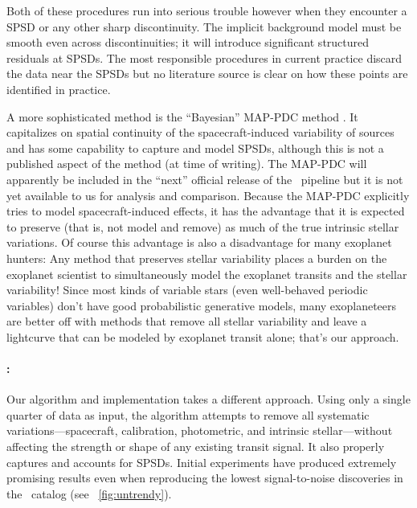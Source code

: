 \documentclass[letterpaper,12pt,preprint]{hack_aastex}
\newcommand{\Untrendy}{\package{Untrendy}}
\begin{document}
Both of these procedures run into serious trouble however when they encounter a SPSD
or any other sharp discontinuity.
The implicit background model must be smooth even across discontinuities; it
will introduce significant structured residuals at SPSDs.
The most responsible procedures in current practice discard the data
near the SPSDs but no literature source is clear on how these points are
identified in practice.

A more sophisticated method is the ``Bayesian'' MAP-PDC method
\citep{map-pdc1,map-pdc2}.
It capitalizes on spatial
continuity of the spacecraft-induced variability of sources and
has some capability to capture and model SPSDs, although this is not
a published aspect of the method (at time of writing).
The MAP-PDC will apparently be included in the ``next'' official release of the
\Kepler\ pipeline but it is not yet available to us for analysis and comparison.
Because the MAP-PDC explicitly tries to model spacecraft-induced effects, it
has the advantage that it is expected to preserve (that is, not model and
remove) as much of the true intrinsic stellar variations.
Of course this advantage is also a disadvantage for many exoplanet hunters:
Any method that preserves stellar variability places a burden on the exoplanet
scientist to simultaneously model the exoplanet transits and the stellar
variability!
Since most kinds of variable stars (even well-behaved periodic variables)
don't have good probabilistic generative models, many exoplaneteers are better
off with methods that remove all stellar variability and leave a lightcurve
that can be modeled by exoplanet transit alone; that's our approach.

\paragraph{\Untrendy:}
Our algorithm and implementation takes a
different approach.
Using only a single quarter of data as input, the algorithm attempts to
remove all systematic variations---spacecraft, calibration, photometric, and
intrinsic stellar---without affecting the strength or shape of any existing
transit signal.
It also properly captures and accounts for SPSDs.
Initial experiments have produced extremely promising results even when
reproducing the lowest signal-to-noise discoveries in the \Kepler\ catalog
(see \figurename~\ref{fig:untrendy}).
\end{document}
